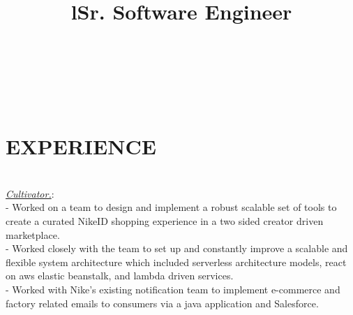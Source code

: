 \documentclass[margin]{res}
\begin{document}
\newcommand{\company}{}

\address{\href{https://cuffney.com}{cuffney.com}\\\href{http://github.com/jwc2790}{github.com/jwc2790}}
\address{josephcuffney@gmail.com\\585-503-2714}

\begin{resume}
\begin{format}
\title{l}\\
\\
\body\\
\end{format}

\section{EXPERIENCE}

\title{\textbf{Sr. Software Engineer}}

\begin{position}\\
\textit{\href{https://wearecultivator.com}{Cultivator.}}:\\
- Worked on a team to design and implement a robust scalable set of tools to create a curated NikeID shopping experience in a two sided creator driven marketplace.\\
- Worked closely with the team to set up and constantly improve a scalable and flexible system architecture which included serverless architecture models, react on aws elastic beanstalk, and lambda driven services.\\
- Worked with Nike's existing notification team to implement e-commerce and factory related emails to consumers via a java application and Salesforce.

\end{position}


\end{resume}
\end{document}
